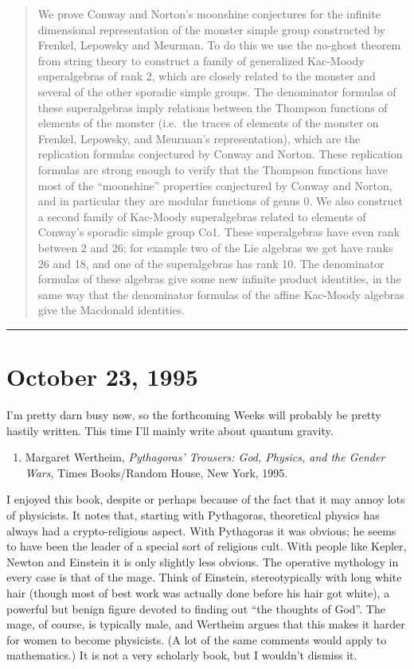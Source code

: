 \documentclass{article}
\def\tightlist{}
\begin{document}
\begin{quote}
We prove Conway and Norton's moonshine conjectures for the infinite
dimensional representation of the monster simple group constructed by
Frenkel, Lepowsky and Meurman. To do this we use the no-ghost theorem
from string theory to construct a family of generalized Kac-Moody
superalgebras of rank 2, which are closely related to the monster and
several of the other sporadic simple groups. The denominator formulas of
these superalgebras imply relations between the Thompson functions of
elements of the monster (i.e.~the traces of elements of the monster on
Frenkel, Lepowsky, and Meurman's representation), which are the
replication formulas conjectured by Conway and Norton. These replication
formulas are strong enough to verify that the Thompson functions have
most of the ``moonshine'' properties conjectured by Conway and Norton,
and in particular they are modular functions of genus 0. We also
construct a second family of Kac-Moody superalgebras related to elements
of Conway's sporadic simple group Co1. These superalgebras have even
rank between 2 and 26; for example two of the Lie algebras we get have
ranks 26 and 18, and one of the superalgebras has rank 10. The
denominator formulas of these algebras give some new infinite product
identities, in the same way that the denominator formulas of the affine
Kac-Moody algebras give the Macdonald identities.
\end{quote}

\begin{center}\rule{0.5\linewidth}{0.5pt}\end{center}
\hypertarget{week67}{%
\section{October 23, 1995}\label{week67}}

I'm pretty darn busy now, so the forthcoming Weeks will probably be
pretty hastily written. This time I'll mainly write about quantum
gravity.

\begin{enumerate}
\def\labelenumi{\arabic{enumi})}
\tightlist
\item
  Margaret Wertheim, \emph{Pythagoras' Trousers: God, Physics, and the
  Gender Wars}, Times Books/Random House, New York, 1995.
\end{enumerate}

I enjoyed this book, despite or perhaps because of the fact that it may
annoy lots of physicists. It notes that, starting with Pythagoras,
theoretical physics has always had a crypto-religious aspect. With
Pythagoras it was obvious; he seems to have been the leader of a special
sort of religious cult. With people like Kepler, Newton and Einstein it
is only slightly less obvious. The operative mythology in every case is
that of the mage. Think of Einstein, stereotypically with long white
hair (though most of best work was actually done before his hair got
white), a powerful but benign figure devoted to finding out ``the
thoughts of God''. The mage, of course, is typically male, and Wertheim
argues that this makes it harder for women to become physicists. (A lot
of the same comments would apply to mathematics.) It is not a very
scholarly book, but I wouldn't dismiss it.
\end{document}

